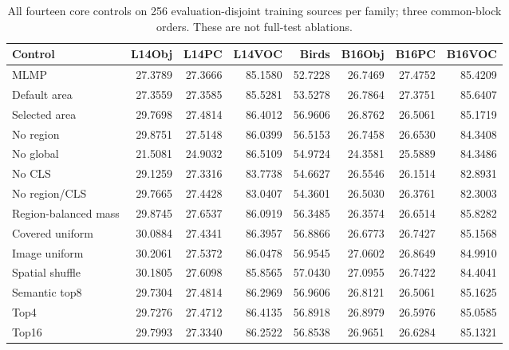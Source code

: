 \begin{table}[htbp]
\centering\scriptsize
\caption{All fourteen core controls on 256 evaluation-disjoint training sources per family; three common-block orders. These are not full-test ablations.}
\label{tab:ablations}
\setlength{\tabcolsep}{4pt}
\begin{tabular}{lrrrrrrr}
\toprule
Control & L14Obj & L14PC & L14VOC & Birds & B16Obj & B16PC & B16VOC \\
\midrule
MLMP & 27.3789 & 27.3666 & 85.1580 & 52.7228 & 26.7469 & 27.4752 & 85.4209 \\
Default area & 27.3559 & 27.3585 & 85.5281 & 53.5278 & 26.7864 & 27.3751 & 85.6407 \\
Selected area & 29.7698 & 27.4814 & 86.4012 & 56.9606 & 26.8762 & 26.5061 & 85.1719 \\
No region & 29.8751 & 27.5148 & 86.0399 & 56.5153 & 26.7458 & 26.6530 & 84.3408 \\
No global & 21.5081 & 24.9032 & 86.5109 & 54.9724 & 24.3581 & 25.5889 & 84.3486 \\
No CLS & 29.1259 & 27.3316 & 83.7738 & 54.6627 & 26.5546 & 26.1514 & 82.8931 \\
No region/CLS & 29.7665 & 27.4428 & 83.0407 & 54.3601 & 26.5030 & 26.3761 & 82.3003 \\
Region-balanced mass & 29.8745 & 27.6537 & 86.0919 & 56.3485 & 26.3574 & 26.6514 & 85.8282 \\
Covered uniform & 30.0884 & 27.4341 & 86.3957 & 56.8866 & 26.6773 & 26.7427 & 85.1568 \\
Image uniform & 30.2061 & 27.5372 & 86.0478 & 56.9545 & 27.0602 & 26.8649 & 84.9910 \\
Spatial shuffle & 30.1805 & 27.6098 & 85.8565 & 57.0430 & 27.0955 & 26.7422 & 84.4041 \\
Semantic top8 & 29.7304 & 27.4814 & 86.2969 & 56.9606 & 26.8121 & 26.5061 & 85.1625 \\
Top4 & 29.7276 & 27.4712 & 86.4135 & 56.8918 & 26.8979 & 26.5976 & 85.0585 \\
Top16 & 29.7993 & 27.3340 & 86.2522 & 56.8538 & 26.9651 & 26.6284 & 85.1321 \\
\bottomrule
\end{tabular}
\end{table}
